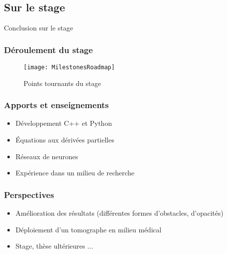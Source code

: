 \subsection{Sur le stage}

\begin{frame}
    \large
    \centering
    Conclusion sur le stage
\end{frame}

\begin{frame}
    \frametitle{Déroulement du stage}
    \begin{figure}
        \texttt{[image: MilestonesRoadmap]}       
        \caption{Points tournants du stage}
    \end{figure}
\end{frame}

\begin{frame}
    \frametitle{Apports et enseignements}
    \begin{itemize}[<+>]
        \item Développement C++ et Python   %
        \item Équations aux dérivées partielles %
        \item Réseaux de neurones %
        \item Expérience dans un milieu de recherche %
    \end{itemize}
\end{frame}

\begin{frame}[<+>]
    \frametitle{Perspectives}
    \begin{itemize}
        \item Amélioration des résultats (différentes formes d'obstacles, d'opacités)
        \item Déploiement d'un tomographe en milieu médical
        \item Stage, thèse ultérieures ...
    \end{itemize}
\end{frame}

% 
